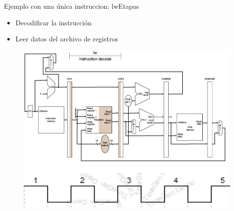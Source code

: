 \documentclass[aspectratio=169,compress]{beamer}
\begin{document}
\begin{footnotesize}
\begin{frame}{Ejemplo con una única instruccion: lw}{Etapas}
\begin{itemize}
\item Decodificar la instrucción
\item Leer datos del archivo de registros
\end{itemize}
\begin{figure}
\includegraphics[scale=0.27]{images/lw2.jpg} \\
\includegraphics[scale=0.27]{images/clock2.jpg} 
\end{figure}

\end{frame}





\end{footnotesize}
\end{document}
